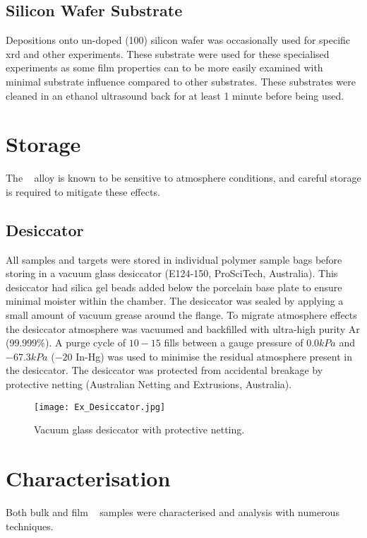 \documentclass[a4paper,12pt,oneside]{report}%
\begin{document}
\subsection{Silicon Wafer Substrate}
Depositions onto un-doped (100) silicon wafer was occasionally used for specific \gls{xrd} and other experiments. These substrate were used for these specialised experiments as some film properties can to be more easily examined with minimal substrate influence compared to other substrates. These substrates were cleaned in an ethanol ultrasound back for at least 1 minute before being used. 

\section{Storage}
The \MgZnCa~ alloy is known to be sensitive to atmosphere conditions, and careful storage is required to mitigate these effects. 

\subsection{Desiccator}
All samples and targets were stored in individual polymer sample bags before storing in a vacuum glass desiccator (E124-150, ProSciTech, Australia). This desiccator had silica gel beads added below the porcelain base plate to ensure minimal moister within the chamber. The desiccator was sealed by applying a small amount of vacuum grease around the flange. To migrate atmosphere effects the desiccator atmosphere was vacuumed and backfilled with ultra-high purity Ar (99.999\%). A purge cycle of $10 - 15$ fills between a gauge pressure of $0.0 kPa$ and $-67.3 kPa$ ($-20$ In-Hg) was used to minimise the residual atmosphere present in the desiccator. The desiccator was protected from accidental breakage by protective netting (Australian Netting and Extrusions, Australia).

\begin{figure}[htbp]
	\centering
	\texttt{[image: Ex\_Desiccator.jpg]}
	\caption{Vacuum glass desiccator with protective netting.}
	\label{fig:Desiccator}
\end{figure}

\section{Characterisation}
Both bulk and film \MgZnCa~ samples were characterised and analysis with numerous techniques. 
\end{document}
